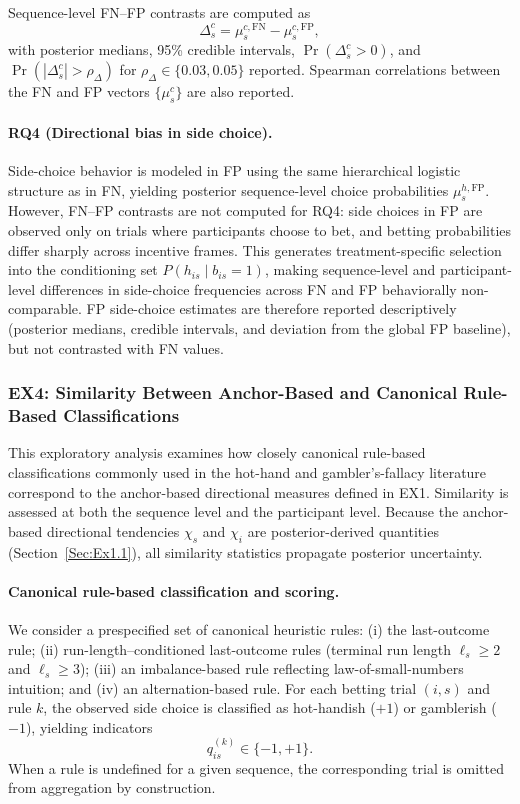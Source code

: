 \documentclass[11pt,a4paper]{article}
\numberwithin{equation}{section}
\begin{document}
Sequence-level FN--FP contrasts are computed as
\[
\Delta_s^{c} = \mu_s^{c,\mathrm{FN}} - \mu_s^{c,\mathrm{FP}},
\]
with posterior medians, 95\% credible intervals, $\Pr(\Delta_s^{c}>0)$, and  
$\Pr(|\Delta_s^{c}| > \rho_\Delta)$ for $\rho_\Delta \in \{0.03, 0.05\}$ reported.  
Spearman correlations between the FN and FP vectors $\{\mu_s^{c}\}$ are also reported.

\paragraph{RQ4 (Directional bias in side choice).}
Side-choice behavior is modeled in FP using the same hierarchical logistic structure 
as in FN, yielding posterior sequence-level choice probabilities $\mu_s^{h,\mathrm{FP}}$.  
However, FN--FP contrasts are not computed for RQ4:  
side choices in FP are observed only on trials where participants choose to bet, and 
betting probabilities differ sharply across incentive frames.  
This generates treatment-specific selection into the conditioning set 
$P(h_{is} \mid b_{is}=1)$, making sequence-level and participant-level differences in 
side-choice frequencies across FN and FP behaviorally non-comparable. FP side-choice estimates are therefore reported descriptively (posterior medians, 
credible intervals, and deviation from the global FP baseline), but not contrasted 
with FN values.



\subsubsection{EX4: Similarity Between Anchor-Based and Canonical Rule-Based Classifications}
\label{Sec:Ex4}

This exploratory analysis examines how closely canonical rule-based
classifications commonly used in the hot-hand and gambler’s-fallacy literature
correspond to the anchor-based directional measures defined in EX1.
Similarity is assessed at both the sequence level and the participant level.
Because the anchor-based directional tendencies $\chi_s$ and $\chi_i$ are
posterior-derived quantities (Section~\ref{Sec:Ex1.1}), all similarity statistics
propagate posterior uncertainty.

\paragraph{Canonical rule-based classification and scoring.}
We consider a prespecified set of canonical heuristic rules:
(i) the last-outcome rule;
(ii) run-length–conditioned last-outcome rules (terminal run length
$\ell_s \ge 2$ and $\ell_s \ge 3$);
(iii) an imbalance-based rule reflecting law-of-small-numbers intuition; and
(iv) an alternation-based rule.
For each betting trial $(i,s)$ and rule $k$, the observed side choice is classified
as hot-handish ($+1$) or gamblerish ($-1$), yielding indicators
\[
q^{(k)}_{is} \in \{-1,+1\}.
\]
When a rule is undefined for a given sequence, the corresponding trial is omitted
from aggregation by construction.
\end{document}
